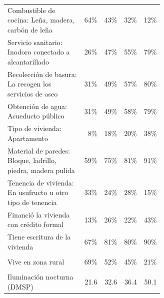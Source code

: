 \begin{table}[H]
\begin{minipage}[t]{0.49\textwidth}
{\begin{tabular}[t]{p{0.62\linewidth}rrrr}
        \quad Combustible de cocina: Leña, madera, carbón de leña & 64\% & 43\% & 32\% & 12\% \\
        \quad Servicio sanitario: Inodoro conectado a alcantarillado & 26\% & 47\% & 55\% & 79\% \\
        \quad Recolección de basura: La recogen los servicios de aseo & 31\% & 49\% & 57\% & 80\% \\
        \quad Obtención de agua: Acueducto público & 31\% & 49\% & 58\% & 79\% \\
        \quad Tipo de vivienda: Apartamento & 8\% & 18\% & 20\% & 38\% \\
        \quad Material de paredes: Bloque, ladrillo, piedra, madera pulida & 59\% & 75\% & 81\% & 91\% \\
        \quad Tenencia de vivienda: En usufructo u otro tipo de tenencia & 33\% & 24\% & 28\% & 15\% \\
        \quad Financió la vivienda con crédito formal & 13\% & 26\% & 22\% & 43\% \\
        \quad Tiene escritura de la vivienda & 67\% & 81\% & 80\% & 90\% \\
        \addlinespace\multicolumn{5}{l}{\textbf{Zona de residencia}} \\
        \quad Vive en zona rural & 69\% & 52\% & 45\% & 21\% \\
        \addlinespace\multicolumn{5}{l}{\textbf{Geoespacial}} \\
        \quad Iluminación nocturna (DMSP) & 21.6 & 32.6 & 36.4 & 50.1 \\
      \bottomrule
    \end{tabular}}
  \end{minipage}\hfill
  \begin{minipage}[t]{0.49\textwidth}
\end{minipage}
\end{table}
